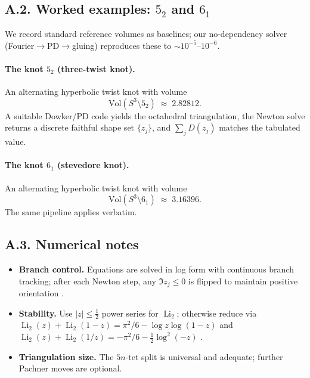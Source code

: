 \documentclass[10pt,reprint,aps,onecolumn,nofootinbib]{revtex4-2}
\begin{document}
    \subsection*{A.2. Worked examples: \(5_2\) and \(6_1\)}
    We record standard reference volumes as baselines; our no-dependency solver (Fourier\(\to\)PD\(\to\)gluing) reproduces these to \(\sim10^{-5}\)–\(10^{-6}\).

    \paragraph{The knot \(5_2\) (three-twist knot).}
        An alternating hyperbolic twist knot with volume
        \[
            \mathrm{Vol}(S^3\setminus 5_2)\;\approx\;2.82812.
        \]
        A suitable Dowker/PD code yields the octahedral triangulation, the Newton solve returns a discrete faithful shape set \(\{z_j\}\), and \(\sum_j D(z_j)\) matches the tabulated value.

    \paragraph{The knot \(6_1\) (stevedore knot).}
        An alternating hyperbolic twist knot with volume
        \[
            \mathrm{Vol}(S^3\setminus 6_1)\;\approx\;3.16396.
        \]
        The same pipeline applies verbatim.

    \subsection*{A.3. Numerical notes}
    \begin{itemize}
        \item \textbf{Branch control.} Equations are solved in log form with continuous branch tracking; after each Newton step, any \(\Im z_j\le0\) is flipped to maintain positive orientation \cite{NeumannZagier1985}.
        \item \textbf{Stability.} Use \(|z|\le\tfrac12\) power series for \(\operatorname{Li}_2\); otherwise reduce via
        \(\operatorname{Li}_2(z)+\operatorname{Li}_2(1-z)=\pi^2/6-\log z\log(1-z)\) and
        \(\operatorname{Li}_2(z)+\operatorname{Li}_2(1/z)=-\pi^2/6-\tfrac12\log^2(-z)\) \cite{Lewin1981}.
        \item \textbf{Triangulation size.} The \(5n\)‐tet split is universal and adequate; further Pachner moves are optional.
    \end{itemize}
\end{document}
